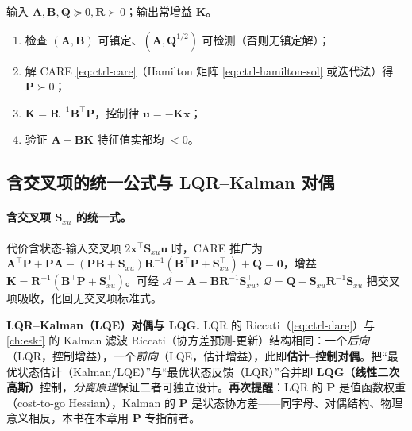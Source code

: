 \begin{algo}
\label{alg:ctrl-lqr}
输入 $\mathbf{A},\mathbf{B},\mathbf{Q}\succeq0,\mathbf{R}\succ0$；输出常增益 $\mathbf{K}$。
\begin{enumerate}
  \item 检查 $(\mathbf{A},\mathbf{B})$ 可镇定、$(\mathbf{A},\mathbf{Q}^{1/2})$ 可检测（否则无镇定解）；
  \item 解 CARE \cref{eq:ctrl-care}（Hamilton 矩阵 \cref{eq:ctrl-hamilton-sol} 或迭代法）得 $\mathbf{P}\succ0$；
  \item $\mathbf{K}=\mathbf{R}^{-1}\mathbf{B}^\top\mathbf{P}$，控制律 $\mathbf{u}=-\mathbf{K}\mathbf{x}$；
  \item 验证 $\mathbf{A}-\mathbf{B}\mathbf{K}$ 特征值实部均 $<0$。
\end{enumerate}
\end{algo}

\subsection{含交叉项的统一公式与 LQR--Kalman 对偶}
\label{sec:ctrl-lqe-dual}

\paragraph{含交叉项 $\mathbf{S}_{xu}$ 的统一式。}
代价含状态-输入交叉项 $2\mathbf{x}^\top\mathbf{S}_{xu}\mathbf{u}$ 时\cite{tedrake_underactuated}，CARE 推广为 $\mathbf{A}^\top\mathbf{P}+\mathbf{P}\mathbf{A}-(\mathbf{P}\mathbf{B}+\mathbf{S}_{xu})\mathbf{R}^{-1}(\mathbf{B}^\top\mathbf{P}+\mathbf{S}_{xu}^\top)+\mathbf{Q}=\mathbf{0}$，增益 $\mathbf{K}=\mathbf{R}^{-1}(\mathbf{B}^\top\mathbf{P}+\mathbf{S}_{xu}^\top)$。可经 $\boldsymbol{\mathcal{A}}=\mathbf{A}-\mathbf{B}\mathbf{R}^{-1}\mathbf{S}_{xu}^\top,\ \boldsymbol{\mathcal{Q}}=\mathbf{Q}-\mathbf{S}_{xu}\mathbf{R}^{-1}\mathbf{S}_{xu}^\top$ 把交叉项吸收，化回无交叉项标准式。

\begin{note}
\textbf{LQR--Kalman（LQE）对偶与 LQG.}\;
LQR 的 Riccati（\cref{eq:ctrl-dare}）与 \cref{ch:eskf} 的 Kalman 滤波 Riccati（协方差预测-更新）结构相同：一个\emph{后向}（LQR，控制增益），一个\emph{前向}（LQE，估计增益），此即\textbf{估计--控制对偶}。把“最优状态估计（Kalman/LQE）”与“最优状态反馈（LQR）”合并即 \textbf{LQG（线性二次高斯）}控制，\emph{分离原理}保证二者可独立设计。\textbf{再次提醒}：LQR 的 $\mathbf{P}$ 是值函数权重（cost-to-go Hessian），Kalman 的 $\mathbf{P}$ 是状态协方差——同字母、对偶结构、物理意义相反，本书在本章用 $\mathbf{P}$ 专指前者。
\end{note}

